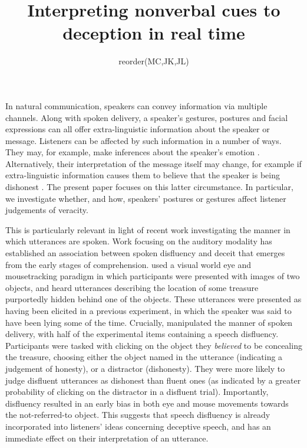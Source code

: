 \documentclass[a4paper,man,natbib]{apa6}
\title{Interpreting nonverbal cues to deception in real time}
\author{reorder(MC,JK,JL)}
\affiliation{Psychology, PPLS, University of Edinburgh}
\begin{document}
\maketitle
\linenumbers
\noindent
In natural communication, speakers can convey information via multiple channels.
Along with spoken delivery, a speaker's gestures, postures and facial expressions can all offer extra-linguistic information about the speaker or message.
Listeners can be affected by such information in a number of ways.
They may, for example, make inferences about the speaker's emotion \citep{Busso2004, Gregersen2005}.
Alternatively, their interpretation of the message itself may change, for example if extra-linguistic information causes them to believe that the speaker is being dishonest \citep{Zuckerman1981}.
The present paper focuses on this latter circumstance.
In particular, we investigate whether, and how, speakers' postures or gestures affect listener judgements of veracity.

This is particularly relevant in light of recent work investigating the manner in which utterances are spoken.
Work focusing on the auditory modality has established an association between spoken disfluency and deceit that emerges from the early stages of comprehension.
\citet{Loy2017} used a visual world eye and mousetracking paradigm in which participants were presented with images of two objects, and heard utterances describing the location of some treasure purportedly hidden behind one of the objects.
These utterances were presented as having been elicited in a previous experiment, in which the speaker was said to have been lying some of the time.
Crucially, \citet{Loy2017} manipulated the manner of spoken delivery, with half of the experimental items containing a speech disfluency.
Participants were tasked with clicking on the object they \textit{believed} to be concealing the treasure, choosing either the object named in the utterance (indicating a judgement of honesty), or a distractor (dishonesty).
They were more likely to judge disfluent utterances as dishonest than fluent ones (as indicated by a greater probability of clicking on the distractor in a disfluent trial). 
Importantly, disfluency resulted in an early bias in both eye and mouse movements towards the not-referred-to object.
This suggests that speech disfluency is already incorporated into listeners' ideas concerning deceptive speech, and has an immediate effect on their interpretation of an utterance. 
\end{document}
